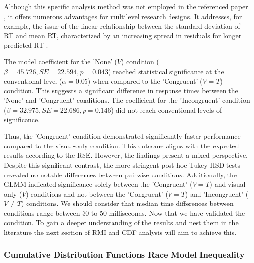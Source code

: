 \documentclass[12pt,oneside,openright]{report}
\begin{document}
Although this specific analysis method was not employed in the referenced paper \parencite{SALTAFOSSI2023108642}, it offers numerous advantages for multilevel research designs. It addresses, for example, the issue of the linear relationship between the standard deviation of RT and mean RT, characterized by an increasing spread in residuals for longer predicted RT \parencite{Lo2015-fv}.

The model coefficient for the 'None' ($V$) condition ($\beta = 45.726, SE = 22.594, p = 0.043$) reached statistical significance at the conventional level ($\alpha =0.05 $) when compared to the 'Congruent' ($V=T$) condition. This suggests a significant difference in response times between the 'None' and 'Congruent' conditions. The coefficient for the 'Incongruent' condition ($\beta = 32.975, SE = 22.686, p = 0.146$) did not reach conventional levels of significance. 

Thus, the 'Congruent' condition demonstrated significantly faster performance compared to the visual-only condition. This outcome aligns with the expected results according to the RSE. However, the findings present a mixed perspective. Despite this significant contrast, the more stringent post hoc Tukey HSD tests revealed no notable differences between pairwise conditions. Additionally, the GLMM indicated significance solely between the 'Congruent' ($V=T$) and visual-only ($V$) conditions and not between the 'Congruent' ($V=T$) and 'Incongruent' ($V \neq T$) conditions. We should consider that median time differences between conditions range between 30 to 50 milliseconds. Now that we have validated the condition. To gain a deeper understanding of the results and nest them in the literature the next section of RMI and CDF analysis will aim to achieve this. 

\subsubsection*{Cumulative Distribution Functions Race Model Inequeality}
\end{document}
